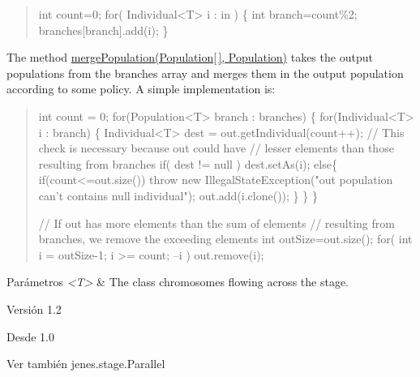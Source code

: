 \begin{quotation}

\begin{DoxyPre}        
    int count=0;    
    for( Individual<T> i : in ) \{
        int branch=count\%2;
            branches[branch].add(i);
    \}
\end{DoxyPre}
\end{quotation}
The method \hyperlink{}{merge\-Population(\-Population\mbox{[}$\,$\mbox{]}, Population)} takes the output populations from the branches array and merges them in the output population according to some policy. A simple implementation is\-: 

\begin{quotation}

\begin{DoxyPre}
    int count = 0;
    for(Population<T>  branch : branches) \{
        for(Individual<T> i : branch) \{
            Individual<T> dest = out.getIndividual(count++);
            // This check is necessary because out could have
            // lesser elements than those resulting from branches
            if( dest != null )
                dest.setAs(i);
            else\{
                if(count<=out.size())
                    throw new IllegalStateException("out population can't contains null individual");
                out.add(i.clone());
            \}
        \}
    \}\end{DoxyPre}



\begin{DoxyPre}    // If out has more elements than the sum of elements
    // resulting from branches, we remove the exceeding elements
    int outSize=out.size();
    for( int i = outSize-1; i >= count; --i )
        out.remove(i);
\end{DoxyPre}
\end{quotation}



\begin{DoxyPre}\end{DoxyPre}



\begin{DoxyPre}
\begin{DoxyParams}{Parámetros}
{\em <T>} & The class chromosomes flowing across the stage.\\
\hline
\end{DoxyParams}
\begin{DoxyVersion}{Versión}
1.2

\end{DoxyVersion}
\begin{DoxySince}{Desde}
1.0
\end{DoxySince}
\begin{DoxySeeAlso}{Ver también}
jenes.stage.Parallel

\end{DoxySeeAlso}
\end{DoxyPre}


